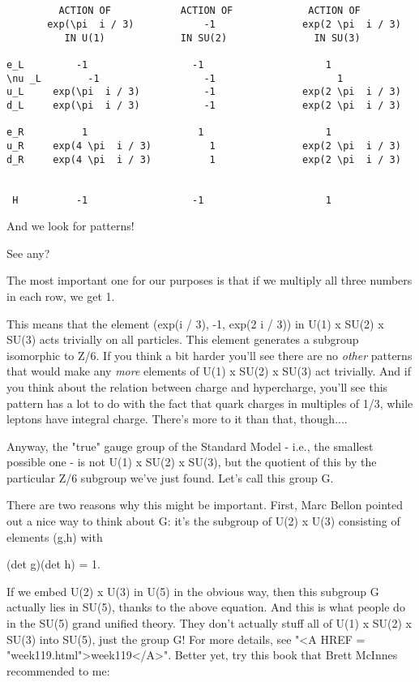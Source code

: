 \begin{verbatim}


         ACTION OF            ACTION OF             ACTION OF
       exp(\pi  i / 3)            -1               exp(2 \pi  i / 3)
          IN U(1)             IN SU(2)               IN SU(3)

e_L         -1                  -1                     1
\nu _L        -1                  -1                     1
u_L     exp(\pi  i / 3)           -1               exp(2 \pi  i / 3)
d_L     exp(\pi  i / 3)           -1               exp(2 \pi  i / 3)

e_R          1                   1                     1
u_R     exp(4 \pi  i / 3)          1               exp(2 \pi  i / 3)
d_R     exp(4 \pi  i / 3)          1               exp(2 \pi  i / 3)


 H          -1                  -1                     1

\end{verbatim}
    
And we look for patterns!  

See any?

The most important one for our purposes is that if we multiply all three
numbers in each row, we get 1. 

This means that the element (exp(\pi  i / 3), -1, exp(2 \pi  i / 3)) in U(1)
x SU(2) x SU(3) acts trivially on all particles.  This element generates
a subgroup isomorphic to Z/6.  If you think a bit harder you'll see
there are no \emph{other} patterns that would make any \emph{more} elements of
U(1) x SU(2) x SU(3) act trivially.  And if you think about the relation
between charge and hypercharge, you'll see this pattern has a lot to do
with the fact that quark charges in multiples of 1/3, while leptons have
integral charge.  There's more to it than that, though....

Anyway, the "true" gauge group of the Standard Model - i.e., the
smallest possible one - is not U(1) x SU(2) x SU(3), but the quotient of
this by the particular Z/6 subgroup we've just found.  Let's call 
this group G.  

There are two reasons why this might be important.  First, Marc Bellon
pointed out a nice way to think about G: it's the subgroup of U(2) x U(3) 
consisting of elements (g,h) with

(det g)(det h) = 1.

If we embed U(2) x U(3) in U(5) in the obvious way, then this subgroup G
actually lies in SU(5), thanks to the above equation.  And this is what
people do in the SU(5) grand unified theory.  They don't actually stuff
all of U(1) x SU(2) x SU(3) into SU(5), just the group G!  For more
details, see "<A HREF = "week119.html">week119</A>".  Better
yet, try this book that Brett McInnes recommended to me:

